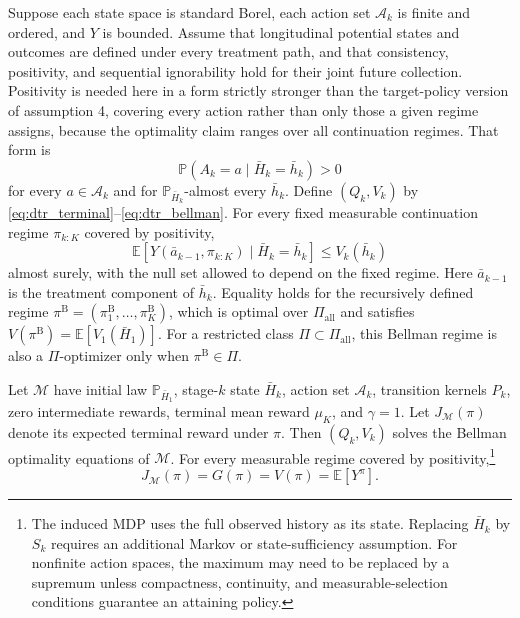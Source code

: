 \begin{theorem}
\label{thm:dtr_rl_equivalence}
Suppose each state space is standard Borel, each action set $\mathcal A_k$ is finite and ordered, and $Y$ is bounded. Assume that longitudinal potential states and outcomes are defined under every treatment path, and that consistency, positivity, and sequential ignorability hold for their joint future collection. Positivity is needed here in a form strictly stronger than the target-policy version of assumption 4, covering every action rather than only those a given regime assigns, because the optimality claim ranges over all continuation regimes. That form is
\[
\mathbb P(A_k=a\mid \bar H_k=\bar h_k)>0
\]
for every $a\in\mathcal A_k$ and for $\mathbb P_{\bar H_k}$-almost every $\bar h_k$. Define $(Q_k,V_k)$ by \eqref{eq:dtr_terminal}--\eqref{eq:dtr_bellman}. For every fixed measurable continuation regime $\pi_{k:K}$ covered by positivity,
\[
\mathbb E\!\left[
Y(\bar a_{k-1},\pi_{k:K})
\mid \bar H_k=\bar h_k
\right]
\leq V_k(\bar h_k)
\]
almost surely, with the null set allowed to depend on the fixed regime. Here $\bar a_{k-1}$ is the treatment component of $\bar h_k$. Equality holds for the recursively defined regime $\pi^{\mathrm B}=(\pi_1^{\mathrm B},\ldots,\pi_K^{\mathrm B})$, which is optimal over $\Pi_{\mathrm{all}}$ and satisfies $V(\pi^{\mathrm B})=\mathbb E[V_1(\bar H_1)]$. For a restricted class $\Pi\subset\Pi_{\mathrm{all}}$, this Bellman regime is also a $\Pi$-optimizer only when $\pi^{\mathrm B}\in\Pi$.

Let $\mathcal M$ have initial law $\mathbb P_{\bar H_1}$, stage-$k$ state $\bar H_k$, action set $\mathcal A_k$, transition kernels $P_k$, zero intermediate rewards, terminal mean reward $\mu_K$, and $\gamma=1$. Let $J_{\mathcal M}(\pi)$ denote its expected terminal reward under $\pi$. Then $(Q_k,V_k)$ solves the Bellman optimality equations of $\mathcal M$. For every measurable regime covered by positivity,\footnote{The induced MDP uses the full observed history as its state. Replacing $\bar H_k$ by $S_k$ requires an additional Markov or state-sufficiency assumption. For nonfinite action spaces, the maximum may need to be replaced by a supremum unless compactness, continuity, and measurable-selection conditions guarantee an attaining policy.}
\[
J_{\mathcal M}(\pi)=G(\pi)=V(\pi)=\mathbb E[Y^\pi].
\]
\end{theorem}

